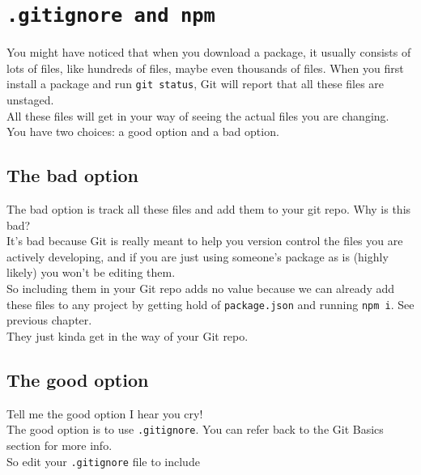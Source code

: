 \section{\texttt{.gitignore and npm}}

You might have noticed that when you download a package, it usually consists of lots of files, like hundreds of files, maybe even thousands of files. When you first install a package and run \texttt{git status}, Git will report that all these files are unstaged. 
\\

All these files will get in your way of seeing the actual files you are changing.
\\

You have two choices: a good option and a bad option.
\\

\subsection{The bad option}
The bad option is track all these files and add them to your git repo. Why is this bad?
\\

It's bad because Git is really meant to help you version control the files you are actively developing, and if you are just using someone's package as is (highly likely) you won't be editing them.
\\

So including them in your Git repo adds no value because we can already add these files to any project by getting hold of \texttt{package.json} and running \texttt{npm i}. See previous chapter.
\\

They just kinda get in the way of your Git repo.
\\

\subsection{The good option}

Tell me the good option I hear you cry!
\\

The good option is to use \texttt{.gitignore}. You can refer back to the Git Basics section for more info.
\\

So edit your \texttt{.gitignore} file to include 
\\

